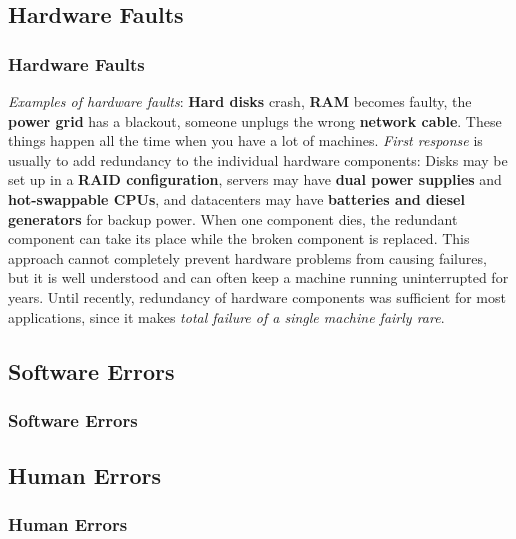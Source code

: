 \documentclass{beamer}
\begin{document}
\subsection{Hardware Faults}
\begin{frame}\frametitle{Hardware Faults}
\scriptsize
\emph{Examples of hardware faults}:
\vfill
\textbf{Hard disks} crash, \textbf{RAM} becomes faulty, the \textbf{power grid} has a blackout,
someone unplugs the wrong \textbf{network cable}. These things happen all the time when you have a lot of machines.
\vfill
\emph{First response} is usually to add redundancy to the individual hardware components:
Disks may be set up in a \textbf{RAID configuration}, servers may have \textbf{dual power supplies} and
\textbf{hot-swappable CPUs}, and datacenters may have \textbf{batteries and diesel generators} for backup power.
\vfill
When one component dies, the redundant component can take its place while the broken component
is replaced. This approach cannot completely prevent hardware problems from causing failures,
but it is well understood and can often keep a machine running uninterrupted for years.
\vfill
Until recently, redundancy of hardware components was sufficient for most applications,
since it makes \emph{total failure of a single machine fairly rare}.
\end{frame}

\subsection{Software Errors}
\begin{frame}\frametitle{Software Errors}
\end{frame}

\subsection{Human Errors}
\begin{frame}\frametitle{Human Errors}
\end{frame}
\end{document}
